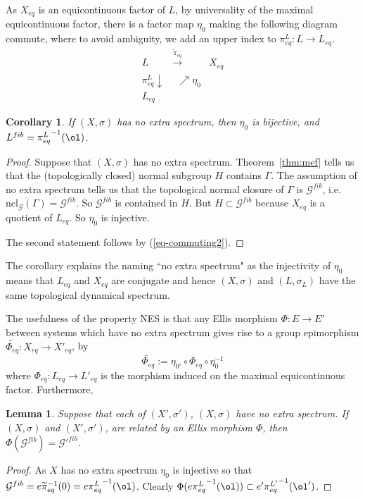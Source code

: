 \documentclass[12pt]{amsart}
\newtheorem{lemma}[theorem]{Lemma}
\newtheorem{cor}[theorem]{Corollary}
\theoremstyle{definition}
\numberwithin{equation}{section}
\newcommand{\Gg}{{\mathcal G}}
\newcommand{\Xe}{X_{eq}}
\newcommand{\pe}{\pi_{eq}}
\newcommand{\tPhe}{\widetilde{\Phi_{eq}}}
\begin{document}
As $ \Xe$ is an equicontinuous factor of $L$, by universality of the maximal equicontinuous factor, there is a factor map $\eta_0$ making the following diagram commute, where to avoid ambiguity, we add an upper index to $\pe^L:L\rightarrow L_{eq}$.
\begin{equation}\label{eq-commuting2}
\begin{matrix}
L & \stackrel{\widetilde\pe}\to \,\, &\!\! \Xe \\
\!\!\!\pe^L  \downarrow & \:\:\nearrow \eta_0\!\! &  \\
L_{eq}  & & 
\end{matrix}
\end{equation}
 



\begin{cor}\label{cor:NES-equiv} If $(X,\sigma)$ has no extra spectrum, then $\eta_0$ is bijective, and $L^{fib} = {\pe^L}^{-1}(\ol)$.
\end{cor}
\begin{proof}
Suppose that $(X,\sigma)$ has no extra spectrum. Theorem~\ref{thm:mef} tells us that the (topologically closed) normal subgroup $H$ contains $\Gamma$.
 The assumption of no extra spectrum tells us  that the topological normal closure of $\Gamma$ is $\Gg^{fib}$, 
 i.e.\ $\overline{\text{ncl}_{\Gg}(\Gamma)} = \Gg^{fib}$.
 So $\Gg^{fib}$ is contained in $H$. But $H \subset \Gg^{fib}$ because $\Xe$ is a quotient of  $L_{eq}$.
  So $\eta_0$ is injective.
 
  
The second statement follows by (\ref{eq-commuting2}). 
\end{proof}
The corollary explains the naming ``no extra spectrum" as the injectivity of $\eta_0$ means that $L_{eq}$ and $\Xe$ are conjugate and hence $(X,\sigma)$ and $(L,\sigma_L)$ have the same 
topological dynamical spectrum. 

The usefulness of the property NES is that any Ellis morphism $\Phi:E\to E'$ between systems which have no extra spectrum gives rise to a group epimorphism  $\tPhe : \Xe \rightarrow X'_{eq}$, by
$$\tPhe := \eta_{0'}\circ \Phi_{eq} \circ \eta_0^{-1}$$
where $\Phi_{eq}:L_{eq}\to L'_{eq}$ is the morphism induced on the maximal equicontinuous factor. Furthermore,
\begin{lemma}\label{lem-fibs}
Suppose that each of $(X',\sigma')$, $(X,\sigma)$   have no extra spectrum. If 
 $(X,\sigma)$ and  $(X',\sigma')$, are related by an Ellis morphism $\Phi$,
 then $\Phi (\Gg^{fib})={\Gg'}^{fib}$. 
 \end{lemma}
\begin{proof}
As $X$ has no extra spectrum $\eta_0$ is injective so that $\Gg^{fib} = e\widetilde\pe^{-1}(0)=e{\pe^L}^{-1}(\ol)$. 
Clearly $\Phi(e{\pe^L}^{-1}(\ol)) \subset  e' {\pe^{L'}}^{-1}(\ol')$. 
\end{proof}
\end{document}
